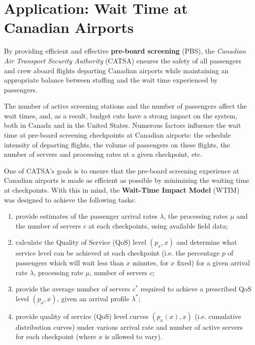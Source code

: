\section{Application: Wait Time at Canadian Airports}
By providing efficient and effective \textbf{pre-board screening} (PBS), the \textit{Canadian Air Transport Security Authority} (CATSA) ensures the safety of all passengers and crew aboard flights departing Canadian airports while maintaining an appropriate balance between staffing and the wait time experienced by passengers. \par The number of active screening stations and the number of passengers affect the wait times, and, as a result, budget cuts have a strong impact on the system, both in Canada and in the United States.\newpage\noindent
Numerous factors influence the wait time at pre-board screening checkpoints at Canadian airports: the schedule intensity of departing flights, the volume of passengers on these flights, the number of servers and processing rates at a given checkpoint, etc. \par One of CATSA's goals is to ensure that the pre-board screening experience at Canadian airports is made as efficient as possible by minimizing the waiting time at checkpoints. With this in mind, the \textbf{Wait-Time Impact Model} (WTIM) was designed to achieve the following tasks: 
\begin{enumerate}[noitemsep]
\item provide estimates of the passenger arrival rates $\lambda$, the processing rates $\mu$ and the number of servers $c$ at each checkpoints, using available field data;
\item calculate the Quality of Service (QoS) level $(p_x,x)$  and determine what service level can be achieved at each checkpoint (i.e. the percentage $p$ of passengers which will wait less than $x$ minutes, for $x$ fixed) for a given arrival rate $\lambda$, processing rate $\mu$, number of servers $c$;
\item provide the average number of servers $c^*$ required to achieve a prescribed QoS level $(p_x,x)$, given an arrival profile $\lambda^*$;
\item provide quality of service (QoS) level curves $(p_x (x),x)$ (i.e. cumulative distribution curves) under various arrival rate and number of active servers for each checkpoint (where $x$ is allowed to vary).\end{enumerate}
